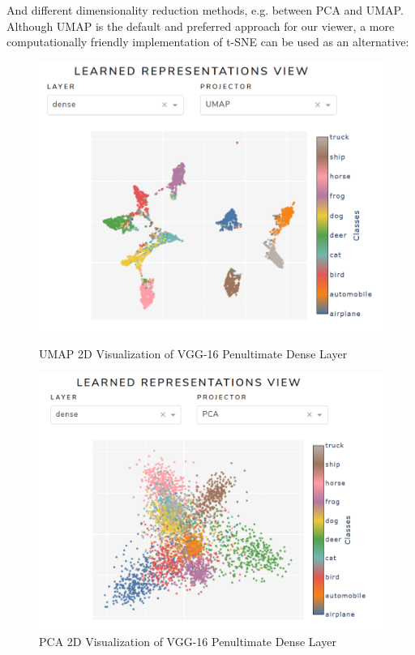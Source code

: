 \vspace{0.2cm}


And different dimensionality reduction methods, e.g. between PCA and UMAP. Although UMAP is the default and preferred approach for our viewer, a more computationally friendly implementation of t-SNE can be used as an alternative:

\vspace{0.2cm}

\begin{figure}[H]
	\begin{minipage}{0.48\textwidth}
		\centering
		\includegraphics[width=1\linewidth]{images/embedding_view/HRV_Fig_012_DEV_Embedding_1.PNG}
		\caption{UMAP 2D Visualization of VGG-16 Penultimate Dense Layer}\label{Fig:HRV_Fig_012_DEV_Embedding_1}
	\end{minipage}\hfill
	\begin{minipage}{0.48\textwidth}
		\centering
		\includegraphics[width=1\linewidth]{images/embedding_view/HRV_Fig_013_DEV_Embedding_2.PNG}
		\caption{PCA 2D Visualization of VGG-16 Penultimate Dense Layer }\label{Fig:HRV_Fig_013_DEV_Embedding_2}
	\end{minipage}
\end{figure}


